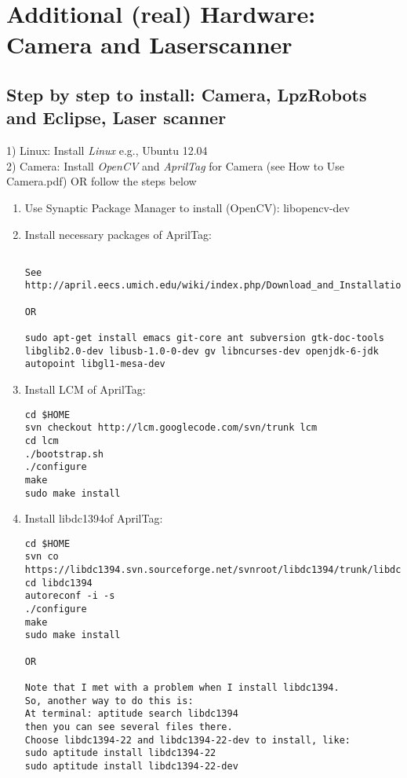 
\section{Additional (real) Hardware: Camera and Laserscanner}

\subsection{Step by step to install: Camera, LpzRobots and Eclipse, Laser scanner}
1) Linux: Install \emph{Linux} e.g., Ubuntu 12.04\\
2) Camera: Install \emph{OpenCV} and \emph{AprilTag} for Camera (see How to Use Camera.pdf) OR follow the steps below
\begin{enumerate}
\item Use Synaptic Package Manager to install (OpenCV): libopencv-dev
\item Install necessary packages of AprilTag:

\begin{lstlisting}

See http://april.eecs.umich.edu/wiki/index.php/Download_and_Installation

OR

sudo apt-get install emacs git-core ant subversion gtk-doc-tools
libglib2.0-dev libusb-1.0-0-dev gv libncurses-dev openjdk-6-jdk
autopoint libgl1-mesa-dev

\end{lstlisting}

\item Install LCM of AprilTag:

\begin{lstlisting}
cd $HOME
svn checkout http://lcm.googlecode.com/svn/trunk lcm
cd lcm
./bootstrap.sh
./configure
make
sudo make install
\end{lstlisting}

\item Install libdc1394of AprilTag:

\begin{lstlisting}
cd $HOME
svn co https://libdc1394.svn.sourceforge.net/svnroot/libdc1394/trunk/libdc1394/
cd libdc1394
autoreconf -i -s
./configure
make
sudo make install

OR

Note that I met with a problem when I install libdc1394.
So, another way to do this is:
At terminal: aptitude search libdc1394
then you can see several files there.
Choose libdc1394-22 and libdc1394-22-dev to install, like:
sudo aptitude install libdc1394-22
sudo aptitude install libdc1394-22-dev
\end{lstlisting}


\end{enumerate}
